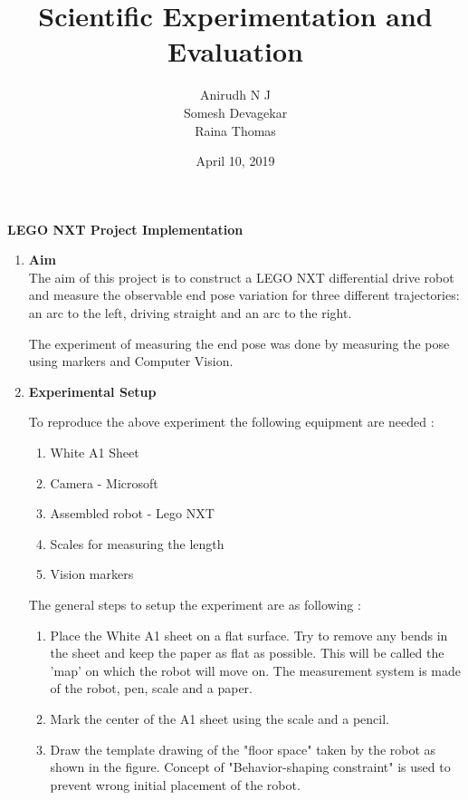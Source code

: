 \documentclass[10pt,a4paper]{article}
\author{\vspace{0.4cm}
	Anirudh N J \\\vspace{0.4cm}
	Somesh Devagekar \\\vspace{0.8cm}
	Raina Thomas}
\title{
	\vspace*{5cm}
	\textbf{Scientific Experimentation and Evaluation}
	}
\date{\color{blue}April 10, 2019}
\begin{document}
	
\begin{titlepage}

	\maketitle
	
\end{titlepage}

\Large\textbf{LEGO NXT Project Implementation}

\Large
\begin{enumerate}[label=\Roman*]

\item
\vspace{0.5cm}
\Large{\textbf{Aim}}\\

The aim of this project is to construct a LEGO NXT differential drive robot and measure the observable end pose variation for three different trajectories: an arc to the left, driving straight and an arc to the right.
\vspace{0.5cm}

The experiment of measuring the end pose was done by measuring the pose using markers and Computer Vision.
   

\vspace{0.5cm}
\item
\Large{\textbf{Experimental Setup}}\\
\vspace{0.5cm}

To reproduce the above experiment the following equipment are needed :
\begin{enumerate}
    \item
    White A1 Sheet
    \item
    Camera - Microsoft 
    \item
    Assembled robot - Lego NXT 
    \item
    Scales for measuring the length 
    \item
    Vision markers
\end{enumerate}
\vspace{0.5cm}

The general steps to setup the experiment are as following :
\begin{enumerate}
    \item
    Place the White A1 sheet on a flat surface.  Try to remove any bends in the sheet and keep the paper as flat as possible. This will be called the 'map' on which the robot will move on. The measurement system is made of the robot, pen, scale and a paper. 
    \item
    Mark the center of the A1 sheet using the scale and a pencil.
    \item
    Draw the template drawing of the "floor space" taken by the robot as shown in the figure. Concept of "Behavior-shaping constraint" is used to prevent wrong initial placement of the robot.
    

\end{enumerate}
\end{enumerate}
\end{document}
